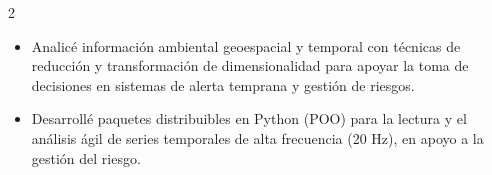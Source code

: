 \documentclass[10pt,a4paper,ragged2e,withhyper]{altacv}
\begin{document}
\begin{paracol}{2}
\divider


\begin{itemize}
\item Analicé información ambiental geoespacial y temporal con técnicas de reducción y transformación de dimensionalidad para apoyar la toma de decisiones en sistemas de alerta temprana y gestión de riesgos.
\item Desarrollé paquetes distribuibles en Python (POO) para la lectura y el análisis ágil de series temporales de alta frecuencia (20 Hz), en apoyo a la gestión del riesgo.
\end{itemize}


\end{paracol}

\clearpage
\end{document}
